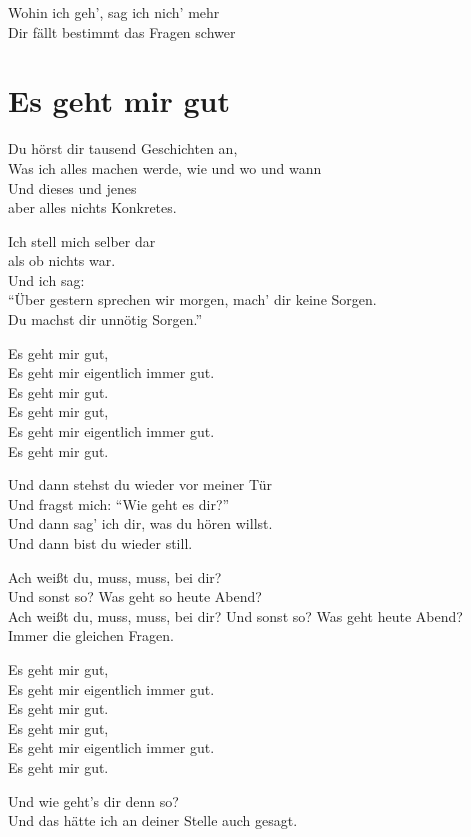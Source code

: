 \documentclass[]{book}
\begin{document}
Wohin ich geh', sag ich nich' mehr\\
Dir fällt bestimmt das Fragen schwer

\hypertarget{es-geht-mir-gut-1}{%
\section{Es geht mir gut}\label{es-geht-mir-gut-1}}

Du hörst dir tausend Geschichten an,\\
Was ich alles machen werde, wie und wo und wann\\
Und dieses und jenes\\
aber alles nichts Konkretes.

Ich stell mich selber dar\\
als ob nichts war.\\
Und ich sag:\\
``Über gestern sprechen wir morgen, mach' dir keine Sorgen.\\
Du machst dir unnötig Sorgen.''

Es geht mir gut,\\
Es geht mir eigentlich immer gut.\\
Es geht mir gut.\\
Es geht mir gut,\\
Es geht mir eigentlich immer gut.\\
Es geht mir gut.

Und dann stehst du wieder vor meiner Tür\\
Und fragst mich: ``Wie geht es dir?''\\
Und dann sag' ich dir, was du hören willst.\\
Und dann bist du wieder still.

Ach weißt du, muss, muss, bei dir?\\
Und sonst so? Was geht so heute Abend?\\
Ach weißt du, muss, muss, bei dir? Und sonst so? Was geht heute Abend?\\
Immer die gleichen Fragen.

Es geht mir gut,\\
Es geht mir eigentlich immer gut.\\
Es geht mir gut.\\
Es geht mir gut,\\
Es geht mir eigentlich immer gut.\\
Es geht mir gut.

Und wie geht's dir denn so?\\
Und das hätte ich an deiner Stelle auch gesagt.
\end{document}
